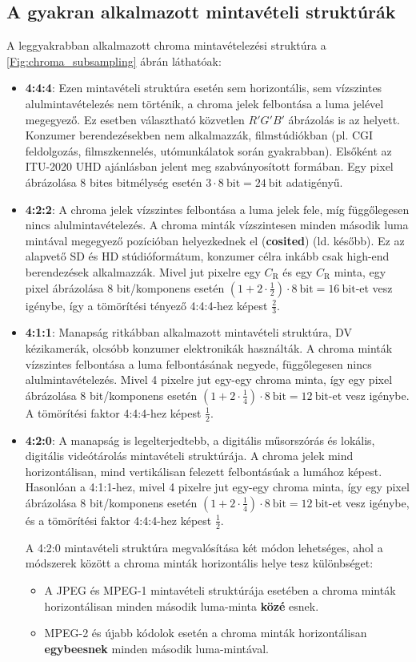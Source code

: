 \subsection{A gyakran alkalmazott mintavételi struktúrák}

A leggyakrabban alkalmazott chroma mintavételezési struktúra a \ref{Fig:chroma_subsampling} ábrán láthatóak:
\begin{itemize}
\item \textbf{4:4:4}: Ezen mintavételi struktúra esetén sem horizontális, sem vízszintes alulmintavételezés nem történik, a chroma jelek felbontása a luma jelével megegyező.
Ez esetben választható közvetlen $R'G'B'$ ábrázolás is az \ycbcr helyett.
Konzumer berendezésekben nem alkalmazzák, filmstúdiókban (pl. CGI feldolgozás, filmszkennelés, utómunkálatok során gyakrabban).
Elsőként az ITU-2020 UHD ajánlásban jelent meg szabványosított formában.
Egy pixel ábrázolása 8 bites bitmélység esetén $3 \cdot 8 ~\mathrm{bit} = 24~\mathrm{bit}$ adatigényű.
%
\item \textbf{4:2:2}: A chroma jelek vízszintes felbontása a luma jelek fele, míg függőlegesen nincs alulmintavételezés.
A chroma minták vízszintesen minden második luma mintával megegyező pozícióban helyezkednek el (\textbf{cosited}) (ld. később).
Ez az alapvető SD és HD stúdióformátum, konzumer célra inkább csak high-end berendezések alkalmazzák.
Mivel jut pixelre egy $C_{\mathrm{R}}$ és egy $C_{\mathrm{R}}$ minta, egy pixel ábrázolása 8 bit/komponens esetén $(1+ 2\cdot \frac{1}{2})\cdot 8~\mathrm{bit} = 16~\mathrm{bit}$-et vesz igénybe, így a tömörítési tényező 4:4:4-hez képest $\frac{2}{3}$.
%
\item \textbf{4:1:1}: Manapság ritkábban alkalmazott mintavételi struktúra, DV kézikamerák, olcsóbb konzumer elektronikák használták.
A chroma minták vízszintes felbontása a luma felbontásának negyede, függőlegesen nincs alulmintavételezés.
Mivel 4 pixelre jut egy-egy chroma minta, így egy pixel ábrázolása 8 bit/komponens esetén $(1+ 2\cdot \frac{1}{4})\cdot 8~\mathrm{bit} = 12~\mathrm{bit}$-et vesz igénybe. 
A tömörítési faktor 4:4:4-hez képest $\frac{1}{2}$.
%
\item \textbf{4:2:0}: A manapság is legelterjedtebb, a digitális műsorszórás és lokális, digitális videótárolás mintavételi struktúrája.
A chroma jelek mind horizontálisan, mind vertikálisan felezett felbontásúak a lumához képest.
Hasonlóan a 4:1:1-hez, mivel 4 pixelre jut egy-egy chroma minta, így egy pixel ábrázolása 8 bit/komponens esetén $(1+ 2\cdot \frac{1}{4})\cdot 8~\mathrm{bit} = 12~\mathrm{bit}$-et vesz igénybe, és a tömörítési faktor 4:4:4-hez képest $\frac{1}{2}$.

A 4:2:0 mintavételi struktúra megvalósítása két módon lehetséges, ahol a módszerek között a chroma minták horizontális helye tesz különbséget:
\begin{itemize}
\item A JPEG és MPEG-1 mintavételi struktúrája esetében a chroma minták horizontálisan minden második luma-minta \textbf{közé} esnek.
\item MPEG-2 és újabb kódolok esetén a chroma minták horizontálisan \textbf{egybeesnek} minden második luma-mintával.
\end{itemize}
\end{itemize}
